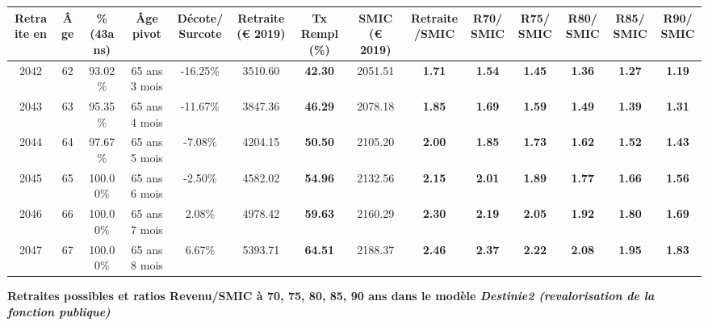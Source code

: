 \begin{adjustbox}{max width=\textwidth} 
\begin{tabular}[htb]{|c|c||c|c|c||c|c||c|c||c|c|c|c|c|} 
\hline 
 Retraite en &  Âge &  \%(43ans) &  Âge pivot &  Décote/Surcote &  Retraite (\euro{} 2019) &  Tx Rempl(\%) &  SMIC (\euro{} 2019) &  Retraite/SMIC &  R70/SMIC &  R75/SMIC &  R80/SMIC &  R85/SMIC &  R90/SMIC \\ 
\hline \hline 
 2042 &  62 &  93.02\% &  65 ans 3 mois &  -16.25\% &  3510.60 &  {\bf 42.30} &  2051.51 &  {\bf 1.71} &  {\bf 1.54} &  {\bf 1.45} &  {\bf 1.36} &  {\bf 1.27} &  {\bf 1.19} \\ 
\hline 
 2043 &  63 &  95.35\% &  65 ans 4 mois &  -11.67\% &  3847.36 &  {\bf 46.29} &  2078.18 &  {\bf 1.85} &  {\bf 1.69} &  {\bf 1.59} &  {\bf 1.49} &  {\bf 1.39} &  {\bf 1.31} \\ 
\hline 
 2044 &  64 &  97.67\% &  65 ans 5 mois &  -7.08\% &  4204.15 &  {\bf 50.50} &  2105.20 &  {\bf 2.00} &  {\bf 1.85} &  {\bf 1.73} &  {\bf 1.62} &  {\bf 1.52} &  {\bf 1.43} \\ 
\hline 
 2045 &  65 &  100.00\% &  65 ans 6 mois &  -2.50\% &  4582.02 &  {\bf 54.96} &  2132.56 &  {\bf 2.15} &  {\bf 2.01} &  {\bf 1.89} &  {\bf 1.77} &  {\bf 1.66} &  {\bf 1.56} \\ 
\hline 
 2046 &  66 &  100.00\% &  65 ans 7 mois &  2.08\% &  4978.42 &  {\bf 59.63} &  2160.29 &  {\bf 2.30} &  {\bf 2.19} &  {\bf 2.05} &  {\bf 1.92} &  {\bf 1.80} &  {\bf 1.69} \\ 
\hline 
 2047 &  67 &  100.00\% &  65 ans 8 mois &  6.67\% &  5393.71 &  {\bf 64.51} &  2188.37 &  {\bf 2.46} &  {\bf 2.37} &  {\bf 2.22} &  {\bf 2.08} &  {\bf 1.95} &  {\bf 1.83} \\ 
\hline 
\hline 
\end{tabular} 
\end{adjustbox} 
 
 \vspace{0.1cm} 
{\bf \noindent Retraites possibles et ratios Revenu/SMIC à 70, 75, 80, 85, 90 ans dans le modèle \emph{Destinie2 (revalorisation de la fonction publique)}}  
 
